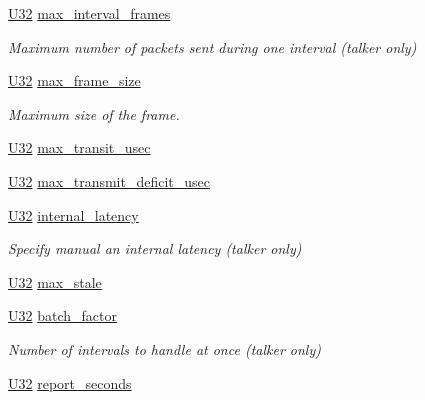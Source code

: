 \begin{DoxyCompactItemize}
\hyperlink{openavb__types__base__pub_8h_a696390429f2f3b644bde8d0322a24124}{U32} \hyperlink{structopenavb__tl__data__cfg_abf63c5094d06b48eb2da41a9cf3e1d00}{max\+\_\+interval\+\_\+frames}
\begin{DoxyCompactList}\small\item\em Maximum number of packets sent during one interval (talker only) \end{DoxyCompactList}\item 
\hyperlink{openavb__types__base__pub_8h_a696390429f2f3b644bde8d0322a24124}{U32} \hyperlink{structopenavb__tl__data__cfg_ac2af862bb15aba31178c61c260f5c54b}{max\+\_\+frame\+\_\+size}
\begin{DoxyCompactList}\small\item\em Maximum size of the frame. \end{DoxyCompactList}\item 
\hyperlink{openavb__types__base__pub_8h_a696390429f2f3b644bde8d0322a24124}{U32} \hyperlink{structopenavb__tl__data__cfg_a0980bddad549fb206164677f8095d44b}{max\+\_\+transit\+\_\+usec}
\item 
\hyperlink{openavb__types__base__pub_8h_a696390429f2f3b644bde8d0322a24124}{U32} \hyperlink{structopenavb__tl__data__cfg_adca8d3921ed9e2b689df1e37ffaf1a3d}{max\+\_\+transmit\+\_\+deficit\+\_\+usec}
\item 
\hyperlink{openavb__types__base__pub_8h_a696390429f2f3b644bde8d0322a24124}{U32} \hyperlink{structopenavb__tl__data__cfg_a770b9a7e3ef496ca3269c2005f12fa81}{internal\+\_\+latency}
\begin{DoxyCompactList}\small\item\em Specify manual an internal latency (talker only) \end{DoxyCompactList}\item 
\hyperlink{openavb__types__base__pub_8h_a696390429f2f3b644bde8d0322a24124}{U32} \hyperlink{structopenavb__tl__data__cfg_aea5235cb82456b3c3285f5f6910dd4dc}{max\+\_\+stale}
\item 
\hyperlink{openavb__types__base__pub_8h_a696390429f2f3b644bde8d0322a24124}{U32} \hyperlink{structopenavb__tl__data__cfg_a9db3c945c8e429a9ca8e13db38447d3c}{batch\+\_\+factor}
\begin{DoxyCompactList}\small\item\em Number of intervals to handle at once (talker only) \end{DoxyCompactList}\item 
\hyperlink{openavb__types__base__pub_8h_a696390429f2f3b644bde8d0322a24124}{U32} \hyperlink{structopenavb__tl__data__cfg_aa421113dd03391cac7220cd7dd7ee59b}{report\+\_\+seconds}

\end{DoxyCompactItemize}
